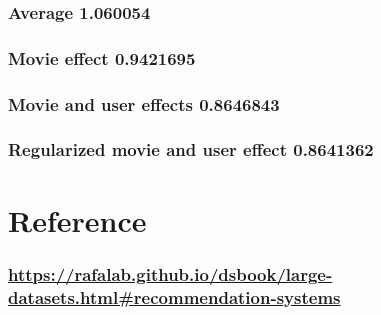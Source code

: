 \documentclass[
]{article}
\begin{document}
\hypertarget{average-1.060054}{%
\subsubsection{\textbar{} Average \textbar{} 1.060054
\textbar{}}\label{average-1.060054}}

\hypertarget{movie-effect-0.9421695}{%
\subsubsection{\textbar{} Movie effect \textbar{} 0.9421695
\textbar{}}\label{movie-effect-0.9421695}}

\hypertarget{movie-and-user-effects-0.8646843}{%
\subsubsection{\textbar{} Movie and user effects \textbar{} 0.8646843
\textbar{}}\label{movie-and-user-effects-0.8646843}}

\hypertarget{regularized-movie-and-user-effect-0.8641362}{%
\subsubsection{\textbar{} Regularized movie and user effect \textbar{}
0.8641362
\textbar{}}\label{regularized-movie-and-user-effect-0.8641362}}

\hypertarget{reference}{%
\section{Reference}\label{reference}}

\hypertarget{httpsrafalab.github.iodsbooklarge-datasets.htmlrecommendation-systems}{%
\subsubsection{\texorpdfstring{\url{https://rafalab.github.io/dsbook/large-datasets.html\#recommendation-systems}}{https://rafalab.github.io/dsbook/large-datasets.html\#recommendation-systems}}\label{httpsrafalab.github.iodsbooklarge-datasets.htmlrecommendation-systems}}
\end{document}
